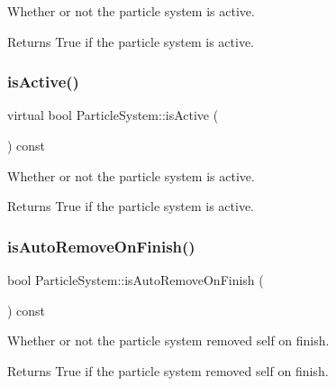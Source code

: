 Whether or not the particle system is active.

\begin{DoxyReturn}{Returns}
True if the particle system is active. 
\end{DoxyReturn}
\mbox{\label{classParticleSystem_aa6c86db12678df30ce2868fac61bcaf2}} 
\subsubsection{\texorpdfstring{is\+Active()}{isActive()}\hspace{0.1cm}{\footnotesize\ttfamily [2/2]}}
{\footnotesize\ttfamily virtual bool Particle\+System\+::is\+Active (\begin{DoxyParamCaption}{ }\end{DoxyParamCaption}) const\hspace{0.3cm}{\ttfamily [virtual]}}

Whether or not the particle system is active.

\begin{DoxyReturn}{Returns}
True if the particle system is active. 
\end{DoxyReturn}
\mbox{\label{classParticleSystem_afb3b1fc509f840948e532012f3a5a98a}} 
\subsubsection{\texorpdfstring{is\+Auto\+Remove\+On\+Finish()}{isAutoRemoveOnFinish()}\hspace{0.1cm}{\footnotesize\ttfamily [1/2]}}
{\footnotesize\ttfamily bool Particle\+System\+::is\+Auto\+Remove\+On\+Finish (\begin{DoxyParamCaption}{ }\end{DoxyParamCaption}) const\hspace{0.3cm}{\ttfamily [virtual]}}

Whether or not the particle system removed self on finish.

\begin{DoxyReturn}{Returns}
True if the particle system removed self on finish. 
\end{DoxyReturn}
\mbox{\label{classParticleSystem_afb8b312b2eeabd69210a5d63392d7626}} 

